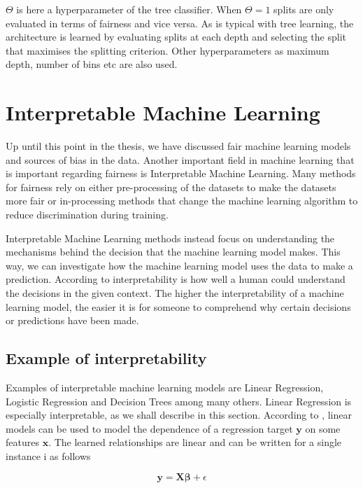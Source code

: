 $\Theta$ is here a hyperparameter of the tree classifier. When $\Theta = 1$ splits are only evaluated in terms of fairness and vice versa.  As is typical with tree learning, the architecture is learned by evaluating splits at each depth and selecting the split that maximises the splitting criterion. Other hyperparameters as maximum depth, number of bins etc are also used.

\section{Interpretable Machine Learning}

Up until this point in the thesis, we have discussed fair machine learning models and sources of bias in the data. Another important field in machine learning that is important regarding fairness is Interpretable Machine Learning. Many methods for fairness rely on either pre-processing of the datasets to make the datasets more fair or in-processing methods that change the machine learning algorithm to reduce discrimination during training. \cite{Mehrabi:2021:CSUR} 

Interpretable Machine Learning methods instead focus on understanding the mechanisms behind the decision that the machine learning model makes. This way, we can investigate how the machine learning model uses the data to make a prediction. According to \citet{Miller:2019:AIJ} interpretability is how well a human could understand the decisions in the given context. The higher the interpretability of a machine learning model, the easier it is for someone to comprehend why certain decisions or predictions have been made. \cite{Molnar:2020:Book}

\subsection{Example of interpretability}

Examples of interpretable machine learning models are Linear Regression, Logistic Regression and Decision Trees among many others. Linear Regression is especially interpretable, as we shall describe in this section. According to \citet{Molnar:2020:Book}, linear models can be used to model the dependence of a regression target $\boldsymbol{y}$ on some features $\boldsymbol{x}$. The learned relationships are linear and can be written for a single instance i as follows

\begin{equation*}
    \boldsymbol{y} = \boldsymbol{X} \boldsymbol{\beta} + \epsilon
\end{equation*}

